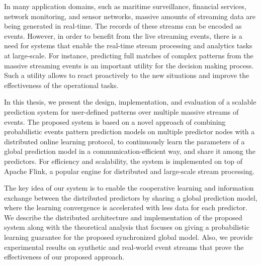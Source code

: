 
\par In many application domains, such as maritime surveillance, financial services, network monitoring, and sensor networks, massive amounts of streaming data are being generated in real-time. The records of these streams can be encoded as events.  However, in order to benefit from the live streaming events, there is a need for systems that enable the real-time stream processing and analytics tasks at large-scale. For instance, predicting full matches of complex patterns from the massive streaming events is an important utility for the decision making process. Such a utility allows to react proactively to the new situations and improve the effectiveness of the operational tasks.

\par In this thesis, we present the design, implementation, and evaluation of a scalable prediction system for user-defined patterns over multiple massive streams of events. The proposed system is based on a novel approach of combining probabilistic events pattern prediction models on multiple predictor nodes with a distributed online learning protocol, to continuously learn the parameters of a global prediction model in a communication-efficient way, and share it among the predictors. For efficiency and scalability, the system is implemented on top of Apache Flink, a popular engine for distributed and large-scale stream processing.



\par  The key idea of our system is to enable the cooperative learning and information exchange between the distributed predictors by sharing a global prediction model, where the learning convergence is accelerated with less data for each predictor. We describe the distributed architecture and implementation of the proposed system along with the theoretical analysis that focuses on giving a probabilistic learning guarantee for the proposed synchronized global model. Also, we provide experimental results on synthetic and real-world event streams that prove the effectiveness of our proposed approach.



